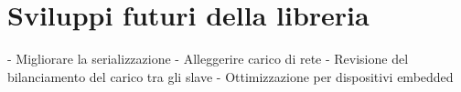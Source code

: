 \section{Sviluppi futuri della libreria}
- Migliorare la serializzazione
- Alleggerire carico di rete
- Revisione del bilanciamento del carico tra gli slave
- Ottimizzazione per dispositivi embedded